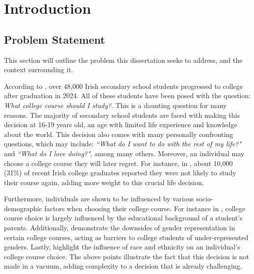 \chapter{Introduction}
\label{chap:introduction}

\section{Problem Statement}

This section will outline the problem this dissertation seeks to address, 
and the context surrounding it.

According to \cite{hea2024key}, over 48,000 Irish secondary school students progressed to college after graduation in 2024.
All of these students have been posed with the question:
\emph{What college course should I study?}.
This is a daunting question for many reasons.
The majority of secondary school students are faced with making this decision 
at 16-19 years old, an age with limited life experience and knowledge about the world.
This decision also comes with many personally confronting questions, which may include:
\emph{``What do I want to do with the rest of my life?"} and \emph{``What do I love doing?"}, among many others.
Moreover, an individual may choose a college course they will later regret.
For instance, in \cite{hea2018graduate}, about 10,000 (31\%) of recent Irish college graduates reported they were not likely to study their course again, 
adding more weight to this crucial life decision.

Furthermore,
individuals are shown to be influenced by various socio-demographic factors when choosing their college course.
For instance in \cite{mullen2011degrees, mullen2003goes, leighton2023rich}, 
college course choice is largely influenced by the educational background 
of a student's parents.
Additionally, \cite{slattery2023navigating, iwish2025survey} demonstrate the downsides of 
gender representation in certain college courses, acting as barriers to college students of 
under-represented genders.
Lastly, \cite{racial2015peter, dickson2010race, xie2003social} highlight the influence of 
race and ethnicity on an individual's college course choice.
The above points illustrate the fact that
 this decision is not made in a vacuum,
adding complexity to a decision that is already challenging.

